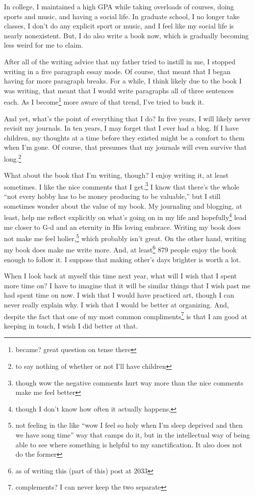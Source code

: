 \documentclass[12pt]{article}[titlepage]
\newcommand{\say}[1]{``#1''}
\renewcommand{\,}{\textsuperscript{,}}
\begin{document}
In college, I maintained a high GPA while taking overloads of courses, doing sports and music, and having a social life.
In graduate school, I no longer take classes, I don't do any explicit sport or music, and I feel like my social life is nearly nonexistent.
But, I do also write a book now, which is gradually becoming less weird for me to claim.

After all of the writing advice that my father tried to instill in me, I stopped writing in a five paragraph essay mode.
Of course, that meant that I began having far more paragraph breaks.
For a while, I think likely due to the book I was writing, that meant that I would write paragraphs all of three sentences each.
As I become\footnote{became? great question on tense there} more aware of that trend, I've tried to buck it.

And yet, what's the point of everything that I do?
In five years, I will likely never revisit my journals.
In ten years, I may forget that I ever had a blog.
If I have children, my thoughts at a time before they existed might be a comfort to them when I'm gone.
Of course, that presumes that my journals will even survive that long.\footnote{to say nothing of whether or not I'll have children}

What about the book that I'm writing, though?
I enjoy writing it, at least sometimes.
I like the nice comments that I get.\footnote{though wow the negative comments hurt way more than the nice comments make me feel better}
I know that there's the whole \say{not every hobby has to be money producing to be valuable,} but I still sometimes wonder about the value of my book.
My journaling and blogging, at least, help me reflect explicitly on what's going on in my life and hopefully\footnote{though I don't know how often it actually happens,} lead me closer to G-d and an eternity in His loving embrace.
Writing my book does not make me feel holier,\footnote{not feeling in the like \say{wow I feel so holy when I'm sleep deprived and then we have song time} way that camps do it, but in the intellectual way of being able to see where something is helpful to my sanctification. It also does not do the former} which probably isn't great.
On the other hand, writing my book does make me write more.
And, at least\footnote{as of writing this (part of this) post at 2033} 879 people enjoy the book enough to follow it.
I suppose that making other's days brighter is worth a lot.

When I look back at myself this time next year, what will I wish that I spent more time on?
I have to imagine that it will be similar things that I wish past me had spent time on now.
I wish that I would have practiced art, though I can never really explain why.
I wish that I would be better at organizing.
And, despite the fact that one of my most common compliments\footnote{complements? I can never keep the two separate} is that I am good at keeping in touch, I wish I did better at that.
\end{document}
